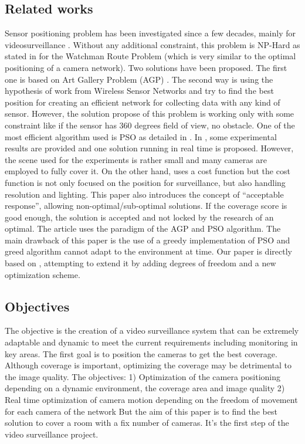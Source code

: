 \subsection{Related works}
Sensor positioning problem has been investigated since a few decades, mainly for videosurveillance \cite{chin1988optimum}. Without any additional constraint, this problem is NP-Hard as stated in \cite{chin1988optimum,zhao2008optimal} for the Watchman Route Problem (which is very similar to the optimal positioning of a camera network). Two solutions have been proposed. The first one is based on Art Gallery Problem (AGP) \cite{moeininouvelle,erdem2006automated}. The second way is using the hypothesis of work from Wireless Sensor Networks \cite{song2008decentralized,wang2013line} and try to find the best position for creating an efficient network for collecting data with any kind of sensor. However, the solution propose of this problem is working only with some constraint like if the sensor has 360 degrees field of view, no obstacle.
 One of the most efficient algorithm used is PSO as detailed in \cite{zhou2011optimal,reddy2012camera}. In \cite{zhou2011optimal}, some experimental results are provided and one solution running in real time is proposed. However, the scene used for the experiments is rather small and many cameras are employed to fully cover it. 
On the other hand, \cite{reddy2012camera} uses a cost function but the cost function is not only focused on the position for surveillance, but also handling resolution and lighting.
This paper also introduces the concept of “acceptable response”, allowing non-optimal/sub-optimal solutions. If the coverage score is good enough, the solution is accepted and not locked by the research of an optimal. The article uses the paradigm of the AGP and PSO algorithm. The main drawback of this paper is the use of a greedy implementation of PSO and greed algorithm cannot adapt to the environment at time. 
Our paper is directly based on \cite{zhou2011optimal,reddy2012camera}, attempting to extend it by adding degrees of freedom and a new optimization scheme. 
\subsection{Objectives }
The objective is the creation of a video surveillance system that can be extremely adaptable and dynamic to meet the current requirements including monitoring in key areas. The first goal is to position the cameras to get the best coverage. Although coverage is important, optimizing the coverage may be detrimental to the image quality. 
The objectives:
1) Optimization of the camera positioning depending on a dynamic environment, the coverage area and image quality 
2) Real time optimization of camera motion depending on the freedom of movement for each camera of the network
But the aim of this paper is to find the best solution to cover a room with a fix number of cameras. It’s the first step of the video surveillance project. 


